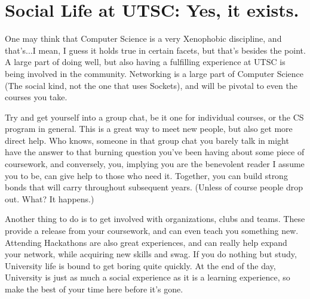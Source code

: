\documentclass[11pt]{article}
\begin{document}
\section{Social Life at UTSC: Yes, it exists.}
One may think that Computer Science is a very Xenophobic discipline, and that's...I mean, I guess it holds true in certain facets, but that's besides the point.  A large part of doing well, but also having a fulfilling experience at UTSC is being involved in the community.  Networking is a large part of Computer Science (The social kind, not the one that uses Sockets), and will be pivotal to even the courses you take.\par
Try and get yourself into a group chat, be it one for individual courses, or the CS program in general.  This is a great way to meet new people, but also get more direct help.  Who knows, someone in that group chat you barely talk in might have the answer to that burning question you've been having about some piece of coursework, and conversely, you, implying you are the benevolent reader I assume you to be, can give help to those who need it.  Together, you can build strong bonds that will carry throughout subsequent years. (Unless of course people drop out.  What? It happens.)\par
Another thing to do is to get involved with organizations, clubs and teams.  These provide a release from your coursework, and can even teach you something new.  Attending Hackathons are also great experiences, and can really help expand your network, while acquiring new skills and swag.  If you do nothing but study, University life is bound to get boring quite quickly.  At the end of the day, University is just as much a social experience as it is a learning experience, so make the best of your time here before it's gone.
\end{document}
